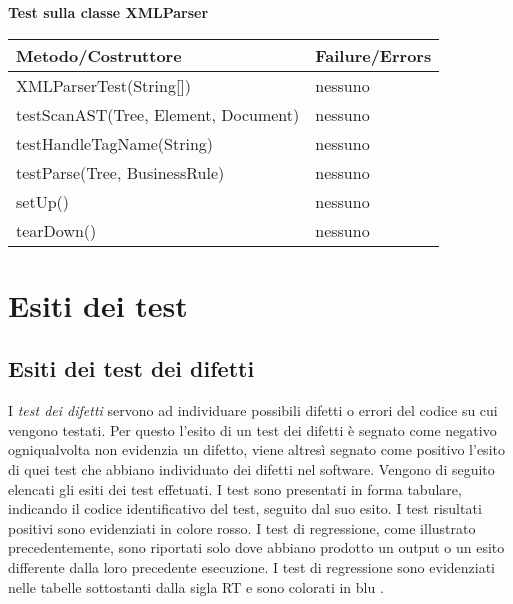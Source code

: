 \begin{center}
\textbf{Test sulla classe XMLParser}\\
\begin{tabular}{|p{}|p{3 cm}|} \hline
\textbf{Metodo/Costruttore} & \textbf{Failure/Errors} \\ \hline
XMLParserTest(String[]) & nessuno \\ \hline
testScanAST(Tree, Element, Document) & nessuno \\ \hline
testHandleTagName(String) & nessuno \\ \hline
testParse(Tree, BusinessRule) & nessuno \\ \hline
setUp() & nessuno \\ \hline
tearDown() & nessuno \\ \hline
\end{tabular}
\end{center}

\chapter{Esiti dei test}

\section{Esiti dei test dei difetti}
I \textit{test dei difetti} servono ad individuare possibili difetti o errori del codice su cui vengono testati. Per questo l'esito di un test dei difetti \`e segnato come negativo ogniqualvolta non evidenzia un difetto, viene altres\`i segnato come positivo l'esito di quei test che abbiano individuato dei difetti nel software.
Vengono di seguito elencati gli esiti dei test effetuati. I test  sono presentati in forma tabulare, indicando il codice identificativo del test, seguito dal suo esito. I test risultati positivi sono evidenziati in colore \textcolor{err}{rosso}. I test di regressione, come illustrato precedentemente, sono riportati solo dove abbiano prodotto un output o un esito differente dalla loro precedente esecuzione. I test di regressione sono evidenziati nelle tabelle sottostanti dalla sigla RT e sono colorati in \textcolor{rt}{blu} .


